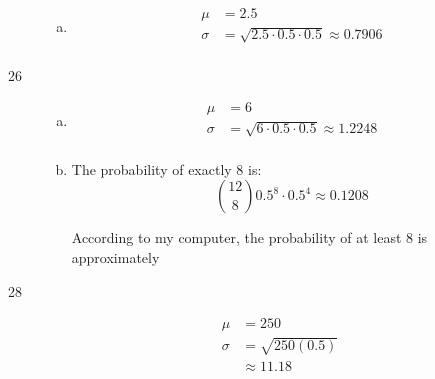 \documentclass[letterpaper]{exam}
\begin{document}
\begin{description}
\begin{enumerate}[(a)]
          \item 
            \begin{align*}
              \mu    & = \boxed{ 2.5 } \\
              \sigma & = \sqrt{2.5 \cdot 0.5 \cdot 0.5} \approx \boxed{ 0.7906 } \\
            \end{align*}
        \end{enumerate}

      \item[26]
        \begin{enumerate}[(a)]
          \item 
            \begin{align*}
              \mu    & = \boxed{ 6 } \\
              \sigma & = \sqrt{6 \cdot 0.5 \cdot 0.5} \approx \boxed{ 1.2248 } \\
            \end{align*}

          \item The probability of exactly 8 is:
            \[
              \binom{12}{8} 0.5^8 \cdot 0.5^4 \approx \boxed{ 0.1208 } 
            \]

            According to my computer, the probability of at least 8 is
            approximately 

        \end{enumerate}




      \item[28]
        \begin{align*}
          \mu    & = 250 \\
          \sigma & = \sqrt{250 (0.5)} \\
                 & \approx 11.18 \\
        \end{align*}


\end{description}
\end{document}
